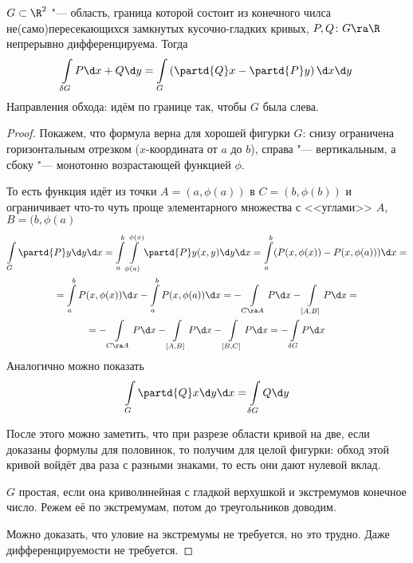 \begin{theorem}
	$G \subset \R^2$ "--- область, граница которой состоит из конечного чилса не(само)пересекающихся замкнутых кусочно-гладких кривых,
	$P, Q\colon G \ra \R$ непрерывно дифференцируема.
	Тогда
	\[ \int\limits_{\delta G} P \d x + Q \d y = \int\limits_G \left(\partd{Q}x - \partd{P}y\right) \d x \d y\]
	Направления обхода: идём по границе так, чтобы $G$ была слева.
\end{theorem}
\begin{proof}
	Покажем, что формула верна для хорошей фигурки $G$: снизу ограничена горизонтальным отрезком ($x$-координата от $a$ до $b$), справа "--- вертикальным, а сбоку "--- монотонно возрастающей функцией $\phi$.
	\begin{center}
	
	\end{center}
	То есть функция идёт из точки $A=(a, \phi(a))$ в $C=(b, \phi(b))$ и ограничивает что-то чуть проще элементарного множества с <<углами>> $A$, $B=(b, \phi(a)$
	\begin{gather*}
		\int\limits_G \partd{P}y \d y \d x
			= \int\limits_a^b \int\limits_{\phi(a)}^{\phi(x)} \partd{P}y(x, y) \d y \d x
			= \int\limits_a^b (P(x, \phi(x)) - P(x, \phi(a))) \d x = \\
			= \int\limits_a^b P(x, \phi(x)) \d x - \int\limits_a^b P(x, \phi(a)) \d x
			= -\int\limits_{C\ra A} P \d x - \int\limits_{[A, B]} P \d x = \\
			= -\int\limits_{C\ra A} P \d x - \int\limits_{[A, B]} P \d x - \int\limits_{[B, C]} P \d x
			= -\int\limits_{\delta G} P \d x
	\end{gather*}
	Аналогично можно показать
	\[ \int\limits_G \partd{Q}x \d y \d x = \int\limits_{\delta G} Q \d y \]
	
	После этого можно заметить, что при разрезе области кривой на две, если доказаны формулы для половинок, то получим для целой фигурки:
	обход этой кривой войдёт два раза с разными знаками, то есть они дают нулевой вклад.
	\begin{center}
	
	\end{center}
	
	$G$ простая, если она криволинейная с гладкой верхушкой и экстремумов конечное число. 
	Режем её по экстремумам, потом до треугольников доводим.

	Можно доказать, что уловие на экстремумы не требуется, но это трудно.
	Даже дифференцируемости не требуется.
\end{proof}


